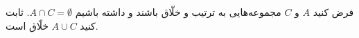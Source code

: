 فرض کنید $A$ و $C$ مجموعه‌هایی به ترتیب  و خلّاق باشند و داشته باشیم $A \cap C = \emptyset$. ثابت کنید $A \cup C$ خلّاق است.